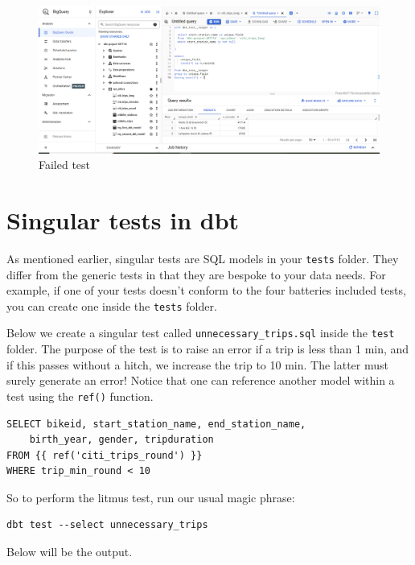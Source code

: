 \documentclass[
]{book}
\begin{document}
\begin{figure}
\centering
\includegraphics{./images/failed_test.png}
\caption{Failed test}
\end{figure}

\hypertarget{singular-tests-in-dbt}{%
\section{Singular tests in dbt}\label{singular-tests-in-dbt}}

As mentioned earlier, singular tests are SQL models in your \texttt{tests} folder. They differ from the generic tests in that they are bespoke to your data needs. For example, if one of your tests doesn't conform to the four batteries included tests, you can create one inside the \texttt{tests} folder.

Below we create a singular test called \texttt{unnecessary\_trips.sql} inside the \texttt{test} folder. The purpose of the test is to raise an error if a trip is less than 1 min, and if this passes without a hitch, we increase the trip to 10 min. The latter must surely generate an error! Notice that one can reference another model within a test using the \texttt{ref()} function.

\begin{verbatim}
SELECT bikeid, start_station_name, end_station_name,
    birth_year, gender, tripduration
FROM {{ ref('citi_trips_round') }}
WHERE trip_min_round < 10
\end{verbatim}

So to perform the litmus test, run our usual magic phrase:

\begin{verbatim}
dbt test --select unnecessary_trips
\end{verbatim}

Below will be the output.
\end{document}
